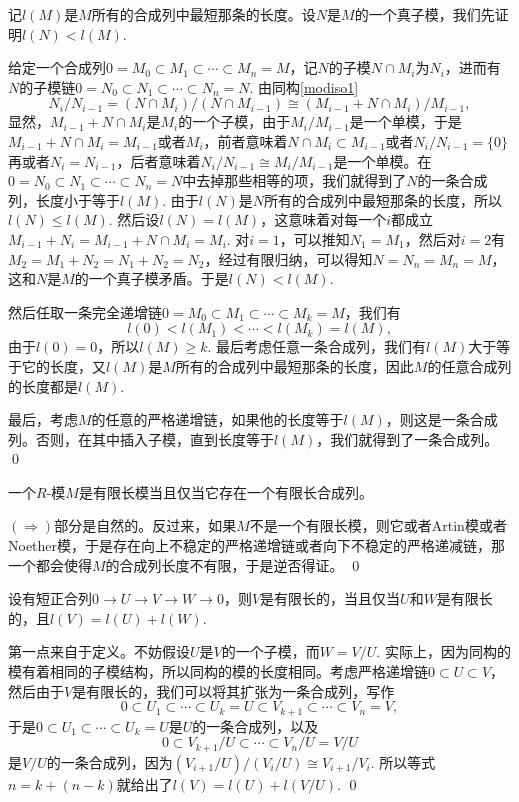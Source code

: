 \proof
	记$l(M)$是$M$所有的合成列中最短那条的长度。设$N$是$M$的一个真子模，我们先证明$l(N)<l(M)$.

	给定一个合成列$0=M_0\subset M_1\subset \cdots\subset M_n=M$，记$N$的子模$N\cap M_i$为$N_i$，进而有$N$的子模链$0=N_0\subset N_1\subset \cdots\subset N_n=N$. 由同构\eqref{modiso1}
	\[
	N_i/N_{i-1}=(N\cap M_i)/(N\cap M_{i-1})\cong (M_{i-1}+N\cap M_i)/M_{i-1},
	\]
	显然，$M_{i-1}+N\cap M_i$是$M_i$的一个子模，由于$M_i/M_{i-1}$是一个单模，于是$M_{i-1}+N\cap M_i=M_{i-1}$或者$M_i$，前者意味着$N\cap M_i\subset M_{i-1}$或者$N_i/N_{i-1}=\{0\}$再或者$N_i=N_{i-1}$，后者意味着$N_i/N_{i-1}\cong M_i/M_{i-1}$是一个单模。在$0=N_0\subset N_1\subset \cdots\subset N_n=N$中去掉那些相等的项，我们就得到了$N$的一条合成列，长度小于等于$l(M)$. 由于$l(N)$是$N$所有的合成列中最短那条的长度，所以$l(N)\leq l(M)$. 然后设$l(N)=l(M)$，这意味着对每一个$i$都成立$M_{i-1}+N_i=M_{i-1}+N\cap M_i=M_i$. 对$i=1$，可以推知$N_1=M_1$，然后对$i=2$有$M_2=M_1+N_2=N_1+N_2=N_2$，经过有限归纳，可以得知$N=N_n=M_n=M$，这和$N$是$M$的一个真子模矛盾。于是$l(N)<l(M)$.

	然后任取一条完全递增链$0=M_0\subset M_1\subset \cdots\subset M_k=M$，我们有
	\[
	l(0)<l(M_1)<\cdots<l(M_k)=l(M),
	\]
	由于$l(0)=0$，所以$l(M)\geq k$. 最后考虑任意一条合成列，我们有$l(M)$大于等于它的长度，又$l(M)$是$M$所有的合成列中最短那条的长度，因此$M$的任意合成列的长度都是$l(M)$.

	最后，考虑$M$的任意的严格递增链，如果他的长度等于$l(M)$，则这是一条合成列。否则，在其中插入子模，直到长度等于$l(M)$，我们就得到了一条合成列。
\qed

\pro 一个$R$-模$M$是有限长模当且仅当它存在一个有限长合成列。

\proof
	$(\Rightarrow)$部分是自然的。反过来，如果$M$不是一个有限长模，则它或者Artin模或者Noether模，于是存在向上不稳定的严格递增链或者向下不稳定的严格递减链，那一个都会使得$M$的合成列长度不有限，于是逆否得证。
\qed

\pro 设有短正合列$0\to U\to V\to W\to 0$，则$V$是有限长的，当且仅当$U$和$W$是有限长的，且$l(V)=l(U)+l(W)$.

\proof
	第一点来自于定义。不妨假设$U$是$V$的一个子模，而$W=V/U$. 实际上，因为同构的模有着相同的子模结构，所以同构的模的长度相同。考虑严格递增链$0\subset U\subset V$，然后由于$V$是有限长的，我们可以将其扩张为一条合成列，写作
	\[
	0\subset U_1\subset \cdots \subset U_k=U\subset V_{k+1}\subset \cdots \subset V_n=V,
	\]
	于是$0\subset U_1\subset \cdots \subset U_k=U$是$U$的一条合成列，以及
	\[
	0\subset V_{k+1}/U\subset \cdots \subset V_n/U=V/U
	\]
	是$V/U$的一条合成列，因为$(V_{i+1}/U)/(V_{i}/U)\cong V_{i+1}/V_i$. 所以等式$n=k+(n-k)$就给出了$l(V)=l(U)+l(V/U)$.
\qed

